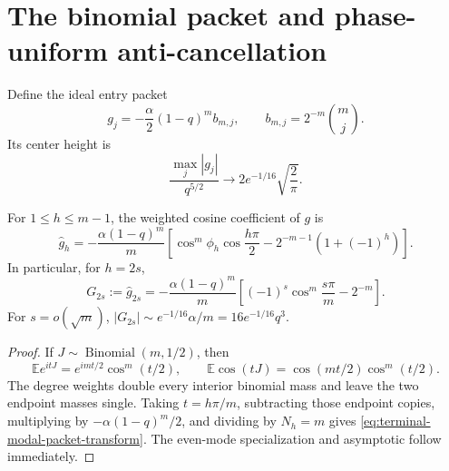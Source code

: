 \section{The binomial packet and phase-uniform anti-cancellation}
\label{sec:terminal-modal-packet}

Define the ideal entry packet
\begin{equation}
 g_j=-\frac{\alpha}{2}(1-q)^m b_{m,j},
 \qquad b_{m,j}=2^{-m}\binom mj.
 \label{eq:terminal-modal-packet}
\end{equation}
Its center height is
\begin{equation}
 \frac{\max_j|g_j|}{q^{5/2}}
 \longrightarrow 2e^{-1/16}\sqrt{\frac2\pi}.
 \label{eq:terminal-modal-packet-height}
\end{equation}

\begin{lemma}
\label{lem:terminal-modal-packet-transform}
For $1\le h\le m-1$, the weighted cosine coefficient of $g$ is
\begin{equation}
 \widehat g_h=-\frac{\alpha(1-q)^m}{m}
 \left[
  \cos^m\phi_h\cos\frac{h\pi}{2}
  -2^{-m-1}(1+(-1)^h)
 \right].
 \label{eq:terminal-modal-packet-transform}
\end{equation}
In particular, for $h=2s$,
\begin{equation}
 G_{2s}:=\widehat g_{2s}
 =-\frac{\alpha(1-q)^m}{m}
 \left[(-1)^s\cos^m\frac{s\pi}{m}-2^{-m}\right].
 \label{eq:terminal-modal-even-packet}
\end{equation}
For $s=o(\sqrt m)$,
$|G_{2s}|\sim e^{-1/16}\alpha/m=16e^{-1/16}q^3$.
\end{lemma}

\begin{proof}
If $J\sim\operatorname{Binomial}(m,1/2)$, then
\[
 \mathbb E e^{itJ}=e^{imt/2}\cos^m(t/2),
 \qquad
 \mathbb E\cos(tJ)=\cos(mt/2)\cos^m(t/2).
\]
The degree weights double every interior binomial mass and leave the two
endpoint masses single.  Taking $t=h\pi/m$, subtracting those endpoint
copies, multiplying by $-\alpha(1-q)^m/2$, and dividing by $N_h=m$ gives
\eqref{eq:terminal-modal-packet-transform}.  The even-mode specialization and
asymptotic follow immediately.
\end{proof}

